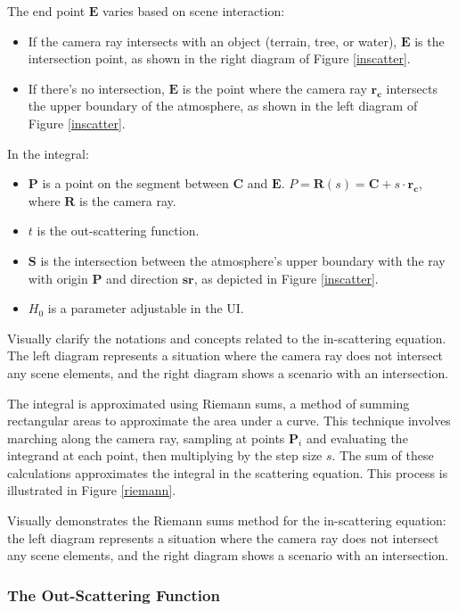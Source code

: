 The end point $\mathbf{E}$ varies based on scene interaction:
\begin{itemize}
    \item If the camera ray intersects with an object (terrain, tree, or water), $\mathbf{E}$ is the intersection point, as shown in the right diagram of Figure \ref{inscatter}.
    \item If there's no intersection, $\mathbf{E}$ is the point where the camera ray $\mathbf{r_c}$ intersects the upper boundary of the atmosphere, as shown in the left diagram of Figure \ref{inscatter}.
\end{itemize}

In the integral:
\begin{itemize}
    \item $\mathbf{P}$ is a point on the segment between $\mathbf{C}$ and $\mathbf{E}$. $P = \mathbf{R}(s) = \mathbf{C} + s \cdot \mathbf{r_c}$, where $\mathbf{R}$ is the camera ray.
    \item $t$ is the out-scattering function.
    \item $\mathbf{S}$ is the intersection between the atmosphere's upper boundary with the ray with origin $\mathbf{P}$ and direction $\mathbf{sr}$, as depicted in Figure \ref{inscatter}.
    \item $H_0$ is a parameter adjustable in the UI.
\end{itemize}

{Visually clarify the notations and concepts related to the in-scattering equation. The left diagram represents a situation where the camera ray does not intersect any scene elements, and the right diagram shows a scenario with an intersection.}

The integral is approximated using Riemann sums, a method of summing rectangular areas to approximate the area under a curve. This technique involves marching along the camera ray, sampling at points $\mathbf{P}_i$ and evaluating the integrand at each point, then multiplying by the step size $s$. The sum of these calculations approximates the integral in the scattering equation. This process is illustrated in Figure \ref{riemann}.

{Visually demonstrates the Riemann sums method for the in-scattering equation: the left diagram represents a situation where the camera ray does not intersect any scene elements, and the right diagram shows a scenario with an intersection.}

\subsubsection{The Out-Scattering Function}

